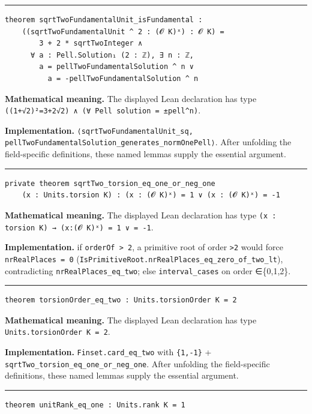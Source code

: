 \documentclass[UTF8,a4paper,11pt,fontset=fandol]{ctexart}
\theoremstyle{definition}
\newcommand{\statementsep}{\par\medskip\hrule\medskip}
\begin{document}
\statementsep
\begin{verbatim}
theorem sqrtTwoFundamentalUnit_isFundamental :
    ((sqrtTwoFundamentalUnit ^ 2 : (𝓞 K)ˣ) : 𝓞 K) =
        3 + 2 * sqrtTwoInteger ∧
      ∀ a : Pell.Solution₁ (2 : ℤ), ∃ n : ℤ,
        a = pellTwoFundamentalSolution ^ n ∨
          a = -pellTwoFundamentalSolution ^ n
\end{verbatim}
\noindent\textbf{Mathematical meaning.} The displayed Lean declaration has type \texttt{((1+√2)²=3+2√2) ∧ (∀ Pell solution = ±pell\textasciicircum{}n)}.\par
\noindent\textbf{Implementation.} \texttt{⟨sqrtTwoFundamentalUnit\_\allowbreak{}sq, pellTwoFundamentalSolution\_\allowbreak{}generates\_\allowbreak{}normOnePell⟩}. After unfolding the field-specific definitions, these named lemmas supply the essential argument.\par
\statementsep
\begin{verbatim}
private theorem sqrtTwo_torsion_eq_one_or_neg_one
    (x : Units.torsion K) : (x : (𝓞 K)ˣ) = 1 ∨ (x : (𝓞 K)ˣ) = -1
\end{verbatim}
\noindent\textbf{Mathematical meaning.} The displayed Lean declaration has type \texttt{(x : torsion K) → (x:(𝓞 K)ˣ) = 1 ∨ = -1}.\par
\noindent\textbf{Implementation.} if \texttt{orderOf > 2}, a primitive root of order \texttt{>2} would force \texttt{nrRealPlaces = 0} (\texttt{IsPrimitiveRoot.\allowbreak{}nrRealPlaces\_\allowbreak{}eq\_\allowbreak{}zero\_\allowbreak{}of\_\allowbreak{}two\_\allowbreak{}lt}), contradicting \texttt{nrRealPlaces\_\allowbreak{}eq\_\allowbreak{}two}; else \texttt{interval\_\allowbreak{}cases} on order ∈\{0,1,2\}.\par
\statementsep
\begin{verbatim}
theorem torsionOrder_eq_two : Units.torsionOrder K = 2
\end{verbatim}
\noindent\textbf{Mathematical meaning.} The displayed Lean declaration has type \texttt{Units.\allowbreak{}torsionOrder K = 2}.\par
\noindent\textbf{Implementation.} \texttt{Finset.\allowbreak{}card\_\allowbreak{}eq\_\allowbreak{}two} with \texttt{\{1,-1\}} + \texttt{sqrtTwo\_\allowbreak{}torsion\_\allowbreak{}eq\_\allowbreak{}one\_\allowbreak{}or\_\allowbreak{}neg\_\allowbreak{}one}. After unfolding the field-specific definitions, these named lemmas supply the essential argument.\par
\statementsep
\begin{verbatim}
theorem unitRank_eq_one : Units.rank K = 1
\end{verbatim}
\end{document}
